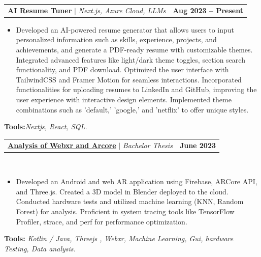 \documentclass[letterpaper,11pt]{article}
\makeatletter
\newcommand{\resumeItem}[1]{
  \item\small{
    {#1 \vspace{-2pt}}
  }
}
\newcommand{\resumeProjectHeading}[2]{
    \item
    \begin{tabular*}{1.001\textwidth}{l@{\extracolsep{\fill}}r}
      \small#1 & \textbf{\small #2}\\
    \end{tabular*}\vspace{-7pt}
}
\newcommand{\resumeItemListStart}{\begin{itemize}}
\newcommand{\resumeItemListEnd}{\end{itemize}\vspace{-5pt}}
\makeatother
\begin{document}
            

                

\resumeProjectHeading
{\textbf{AI Resume Tuner} $|$ \emph{Next.js, Azure Cloud, LLMs}}{Aug 2023 -- Present}
\resumeItemListStart
            \resumeItem{Developed an AI-powered resume generator that allows users to input personalized information such as skills, experience, projects, and achievements, and generate a PDF-ready resume with customizable themes. Integrated advanced features like light/dark theme toggles, section search functionality, and PDF download. Optimized the user interface with TailwindCSS and Framer Motion for seamless interactions. Incorporated functionalities for uploading resumes to LinkedIn and GitHub, improving the user experience with interactive design elements. Implemented theme combinations such as 'default,' 'google,' and 'netflix' to offer unique styles.}
\resumeItemListEnd
\vspace{4pt}
\textbf{Tools:}\emph{Nextjs, React, SQL.}

                

 \resumeProjectHeading
          {\textbf{\href{https://www.yakkshit.com/#project-1}{Analysis of Webxr and Arcore}} $|$ \emph{Bachelor Thesis \faGithub}}{June 2023}\\
          \vspace{9pt}
          \vspace{-8pt}
          \resumeItemListStart
            \resumeItem{Developed an Android and web AR application using Firebase, ARCore API, and Three.js. Created a 3D model in Blender deployed to the cloud. Conducted hardware tests and utilized machine learning (KNN, Random Forest) for analysis. Proficient in system tracing tools like TensorFlow Profiler, strace, and perf for performance optimization.}
          \resumeItemListEnd 
          \textbf{Tools:}\emph{
                                Kotlin / Java, Threejs , Webxr, Machine Learning, Gui, hardware Testing, Data analysis.}
\end{document}
